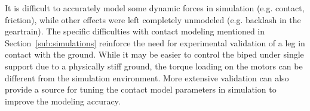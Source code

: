 It is difficult to accurately model some dynamic forces in simulation (e.g. contact, friction), while other effects were left completely unmodeled (e.g. backlash in the geartrain). The specific difficulties with contact modeling mentioned in Section~\ref{sub:simulations} reinforce the need for experimental validation of a leg in contact with the ground. While it may be easier to control the biped under single support due to a physically stiff ground, the torque loading on the motors can be different from the simulation environment. More extensive validation can also provide a source for tuning the contact model parameters in simulation to improve the modeling accuracy. 







